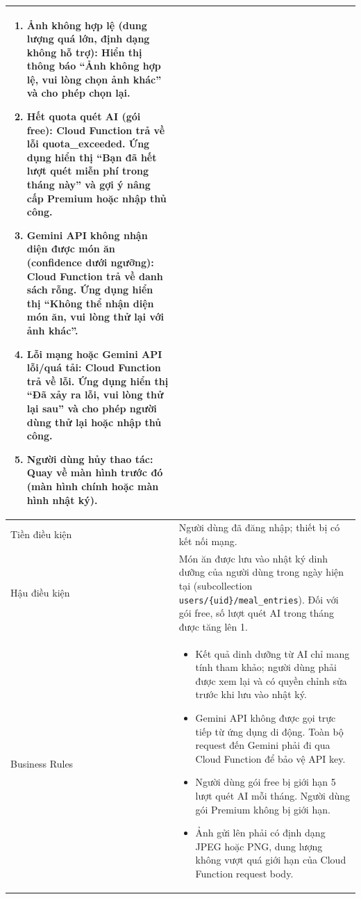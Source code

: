 \begin{longtable}{|p{4cm}|p{11cm}|}
\begin{enumerate}[nosep]
            \item[3a.] Ảnh không hợp lệ (dung lượng quá lớn, định dạng không hỗ trợ): Hiển thị thông báo ``Ảnh không hợp lệ, vui lòng chọn ảnh khác'' và cho phép chọn lại.
            \item[5a.] Hết quota quét AI (gói free): Cloud Function trả về lỗi quota\_exceeded. Ứng dụng hiển thị ``Bạn đã hết lượt quét miễn phí trong tháng này'' và gợi ý nâng cấp Premium hoặc nhập thủ công.
            \item[5b.] Gemini API không nhận diện được món ăn (confidence dưới ngưỡng): Cloud Function trả về danh sách rỗng. Ứng dụng hiển thị ``Không thể nhận diện món ăn, vui lòng thử lại với ảnh khác''.
            \item[5c.] Lỗi mạng hoặc Gemini API lỗi/quá tải: Cloud Function trả về lỗi. Ứng dụng hiển thị ``Đã xảy ra lỗi, vui lòng thử lại sau'' và cho phép người dùng thử lại hoặc nhập thủ công.
            \item[3b/8a.] Người dùng hủy thao tác: Quay về màn hình trước đó (màn hình chính hoặc màn hình nhật ký).
        \end{enumerate} \\
    \hline
    Tiền điều kiện & Người dùng đã đăng nhập; thiết bị có kết nối mạng. \\
    \hline
    Hậu điều kiện & Món ăn được lưu vào nhật ký dinh dưỡng của người dùng trong ngày hiện tại (subcollection \texttt{users/\{uid\}/meal\_entries}). Đối với gói free, số lượt quét AI trong tháng được tăng lên 1. \\
    \hline
    Business Rules &
        \begin{itemize}[nosep]
            \item Kết quả dinh dưỡng từ AI chỉ mang tính tham khảo; người dùng phải được xem lại và có quyền chỉnh sửa trước khi lưu vào nhật ký.
            \item Gemini API không được gọi trực tiếp từ ứng dụng di động. Toàn bộ request đến Gemini phải đi qua Cloud Function để bảo vệ API key.
            \item Người dùng gói free bị giới hạn 5 lượt quét AI mỗi tháng. Người dùng gói Premium không bị giới hạn.
            \item Ảnh gửi lên phải có định dạng JPEG hoặc PNG, dung lượng không vượt quá giới hạn của Cloud Function request body.
        \end{itemize} \\
    \hline
\end{longtable}

